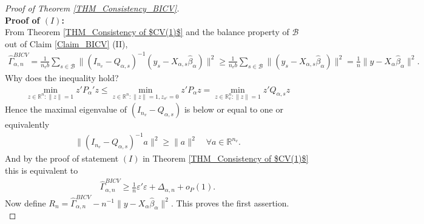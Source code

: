 \documentclass[Research_Module_ES.tex]{subfiles}
\begin{document}
\begin{proof}[Proof of Theorem \ref{THM_Consistency_BICV}]~\\
	\textbf{Proof of $(I)$:}\\
	From Theorem \ref{THM_Consistency of $CV(1)$} and the balance property of $\mathcal{B}$ out of Claim \ref{Claim_BICV} (II),
	\begin{align*}
	\hat{\Gamma}_{\alpha,n}^{BICV} = \frac{1}{n_vb}\sum_{s\in \mathcal{B}}\lVert (I_{n_v}-Q_{\alpha,s})^{-1}(y_s-X_{\alpha,s}\hat{\beta}_\alpha)\rVert^2 \ge \frac{1}{n_vb}\sum_{s\in \mathcal{B}}\lVert (y_s-X_{\alpha,s}\hat{\beta}_\alpha)\rVert^2 = \frac{1}{n}\lVert y-X_{\alpha}\hat{\beta}_\alpha\rVert^2.
	\end{align*}
	Why does the inequality hold?
	\begin{align*}
	\min_{z\in \mathbb{R}^n : \lVert z\rVert=1}z'P_\alpha'z 
	\le \min_{z\in \mathbb{R}^n : \lVert z\rVert=1, z_{s^c}=0}z'P_\alpha z
	= \min_{z\in \mathbb{R}^n_v : \lVert z\rVert=1}z'Q_{\alpha,s}z
	\end{align*}
	Hence the maximal eigenvalue of $(I_{n_v}-Q_{\alpha,s})$ is below or equal to one or equivalently 
	\begin{align*}
	\lVert (I_{n_v}-Q_{\alpha,s})^{-1}a\rVert ^2 \ge \lVert a\rVert ^2 \quad \forall a\in \mathbb{R}^{n_v}.
	\end{align*}
	And by the proof of statement $(I)$ in Theorem \ref{THM_Consistency of $CV(1)$} this is equivalent to
	\begin{align*}
	\hat{\Gamma}_{\alpha,n}^{BICV} \ge \frac{1}{n}\varepsilon'\varepsilon + \Delta_{\alpha,n} + o_P(1).
	\end{align*}
	Now define $R_n = \hat{\Gamma}_{\alpha,n}^{BICV} - n^{-1}\lVert y-X_{\alpha}\hat{\beta}_\alpha\rVert^2$. This proves the first assertion.
	\\
	

\end{proof}
\end{document}
